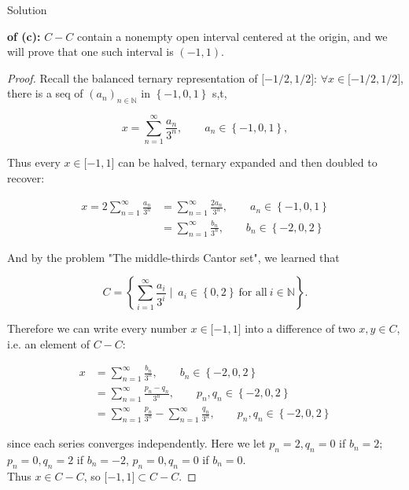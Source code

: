 \documentclass{qlnotes-export}
\begin{document}
\begin{qlsolution}{Solution}

\textbf{of (c):} \(C - C\) contain a nonempty open interval centered at the origin, and we will prove that one such interval is \(( - 1,1)\).

\begin{proof}

Recall the balanced ternary representation of \(\lbrack - 1/2,1/2\rbrack\): \(\forall x \in \lbrack - 1/2,1/2\rbrack\), there is a seq of \((a_{n})_{n \in {\mathbb{N}}}\) in \(\left\{ {- 1,0,1} \right\}\) s,t,

\[x = \sum\limits_{n = 1}^{\infty}\frac{a_{n}}{3^{n}},\qquad a_{n} \in \left\{ {- 1,0,1} \right\},\]

Thus every \(x \in \lbrack - 1,1\rbrack\) can be halved, ternary expanded and then doubled to recover:

\[\begin{matrix}
{x = 2\sum\limits_{n = 1}^{\infty}\frac{a_{n}}{3^{n}}} & {= \sum\limits_{n = 1}^{\infty}\frac{2a_{n}}{3^{n}},\qquad a_{n} \in \left\{ {- 1,0,1} \right\}} \\
 & {= \sum\limits_{n = 1}^{\infty}\frac{b_{n}}{3^{n}},\qquad b_{n} \in \left\{ {- 2,0,2} \right\}}
\end{matrix}\]

And by the problem "The middle-thirds Cantor set", we learned that

\[C = \left\{ {\sum\limits_{i = 1}^{\infty}\frac{a_{i}}{3^{i}} \mid \ a_{i} \in \left\{ {0,2} \right\}\ \text{for all}\ i \in {\mathbb{N}}} \right\}.\]

Therefore we can write every number \(x \in \lbrack - 1,1\rbrack\) into a difference of two \(x,y \in C\), i.e. an element of \(C - C\):

\[\begin{matrix}
x & {= \sum\limits_{n = 1}^{\infty}\frac{b_{n}}{3^{n}},\qquad b_{n} \in \left\{ {- 2,0,2} \right\}} \\
 & {= \sum\limits_{n = 1}^{\infty}\frac{p_{n} - q_{n}}{3^{n}},\qquad p_{n},q_{n} \in \left\{ {- 2,0,2} \right\}} \\
 & {= \sum\limits_{n = 1}^{\infty}\frac{p_{n}}{3^{n}} - \sum\limits_{n = 1}^{\infty}\frac{q_{n}}{3^{n}},\qquad p_{n},q_{n} \in \left\{ {- 2,0,2} \right\}}
\end{matrix}\]

since each series converges independently. Here we let \(p_{n} = 2,q_{n} = 0\) if \(b_{n} = 2\); \(p_{n} = 0,q_{n} = 2\) if \(b_{n} = - 2\), \(p_{n} = 0,q_{n} = 0\) if \(b_{n} = 0\).\\
Thus \(x \in C - C\), so \(\lbrack - 1,1\rbrack \subset C - C\).

\end{proof}

\end{qlsolution}
\end{document}

